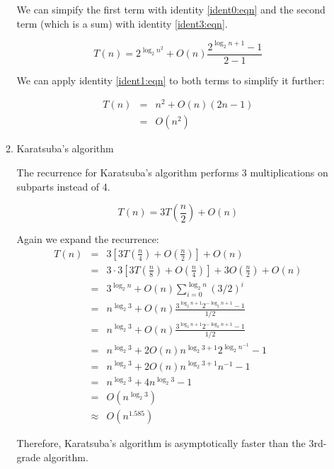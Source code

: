 \documentclass{article}[10pth]
\begin{document}
\begin{enumerate}
\begin{enumerate}
\pagebreak
We can simpify the first term with identity \ref{ident0:eqn} and the second
term (which is a sum) with identity \ref{ident3:eqn}.

\begin{equation}
T(n) = 2^{\log_2{n^2}} + O(n) \frac{2^{\log_2{n}+1} - 1}{2 - 1}
\end{equation}

We can apply identity \ref{ident1:eqn} to both terms to simplify it further:

\begin{eqnarray}
T(n) & = & n^2 + O(n)(2n-1)\\
     & = & O(n^2)
\end{eqnarray}

\item{Karatsuba's algorithm} %

The recurrence for Karatsuba's algorithm performs 3 multiplications on subparts
instead of 4.

\begin{equation}
T(n)= 3T(\frac{n}{2}) + O(n)
\end{equation}

Again we expand the recurrence:
\begin{eqnarray}
T(n) & = & 3 [ 3 T(\frac{n}{4}) + O(\frac{n}{2})] + O(n)\\
     & = & 3\cdot 3 [ 3 T(\frac{n}{8}) + O(\frac{n}{4}) ] + 3O(\frac{n}{2}) + O(n)\\
     & = & 3^{\log_2{n}} + O(n) \sum_{i=0}^{\log_2{n}}(3/2)^i\\
     & = & n^{\log_2{3}} + O(n) \frac{3^{\log_2{n}+1}2^{-\log_2{n}+1} - 1}{1/2}\\
     & = & n^{\log_2{3}} + O(n) \frac{3^{\log_2{n}+1}2^{-\log_2{n}+1} - 1}{1/2}\\
     & = & n^{\log_2{3}} + 2O(n) n^{\log_2{3}+1}2^{\log_2{n^{-1}}} - 1\\
     & = & n^{\log_2{3}} + 2O(n) n^{\log_2{3}+1}n^{-1} - 1\\
     & = & n^{\log_2{3}} + 4n^{\log_2{3}} - 1\\
     & = & O(n^{\log_2{3}})\\
     & \approx & O(n^{1.585})
\end{eqnarray}

Therefore, Karatsuba's algorithm is asymptotically faster than the 3rd-grade
algorithm.

\end{enumerate}


\end{enumerate}
\end{document}
